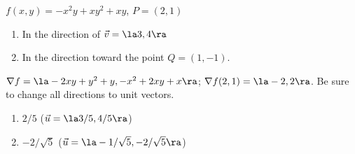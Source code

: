 {$f(x,y) = -x^2y+xy^2+xy$, $P= (2,1)$ \label{12_05_ex_11}
\begin{enumerate}
	\item In the direction of $\vec v = \la 3,4\ra$
	\item In the direction toward the point $Q = (1,-1)$.
\end{enumerate}
}
{$\nabla f = \la -2xy+y^2+y, -x^2+2xy+x\ra$; $\nabla f(2,1) = \la -2,2\ra$.
Be sure to change all directions to unit vectors.
\begin{enumerate}
	\item $2/5$ ($\vec u = \la 3/5,4/5\ra$)
	\item	$-2/\sqrt{5}$ ($\vec u = \la -1/\sqrt{5},-2/\sqrt{5}\ra$)
\end{enumerate}
}